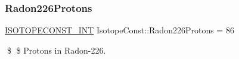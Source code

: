 \subsubsection{\texorpdfstring{Radon226\+Protons}{Radon226Protons}}
{\footnotesize\ttfamily \mbox{\hyperlink{group___isotope_const-_macros_ga5f18360b3e99483a35c32d789e62621c}{I\+S\+O\+T\+O\+P\+E\+C\+O\+N\+S\+T\+\_\+\+I\+NT}} Isotope\+Const\+::\+Radon226\+Protons = 86}

\$ \$ Protons in Radon-\/226. 